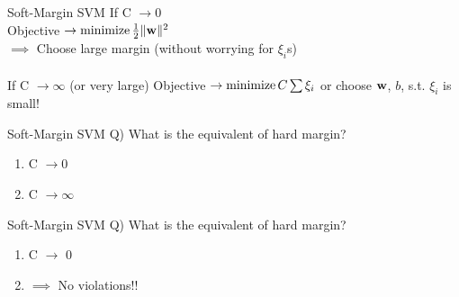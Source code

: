 \documentclass{beamer}
\begin{document}
	\begin{frame}{Soft-Margin SVM}
		If C $\rightarrow 0$ \\
		\hspace{0.3cm} Objective $\rightarrow \operatorname{minimize} \frac{1}{2}\|\mathbf{w}\|^{2}$ \\
		\hspace{0.3cm} $\implies$ Choose large margin (without worrying for $\xi_{i}$s) \\
		\vspace{0.4cm}
		\hspace{2cm} \\
		
		If C $\rightarrow \infty$ (or very large) 
		\hspace{0.3cm} Objective $\rightarrow \operatorname{minimize} C\sum\xi_{i}$ or choose $\mathbf{w}$, $b$, s.t. $\xi_{i}$ is small!
	\end{frame}
	\begin{frame}{Soft-Margin SVM}
		Q) What is the equivalent of hard margin?
		\hspace{0.5cm}\begin{enumerate}[a]
			\item C $\rightarrow 0$
			\item C $\rightarrow \infty$
		\end{enumerate}
	\end{frame}
	\begin{frame}{Soft-Margin SVM}
		Q) What is the equivalent of hard margin?
		\hspace{0.5cm}\begin{enumerate}[a]
			\item C $\rightarrow$ 0
			\item {} $\implies$ No violations!!
		\end{enumerate}
	\end{frame}
	
\end{document}
